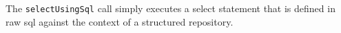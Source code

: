 The \verb+selectUsingSql+ call simply executes a select statement that is defined in raw sql against
the context of a structured repository.
